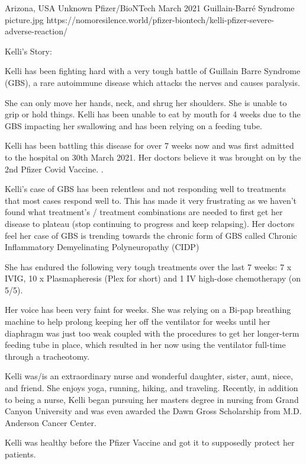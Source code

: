 {Arizona, USA}
{Unknown}
{Pfizer/BioNTech}
{March 2021}
{Guillain-Barré Syndrome}
{picture.jpg}
{https://nomoresilence.world/pfizer-biontech/kelli-pfizer-severe-adverse-reaction/}
{

Kelli’s Story:

Kelli has been fighting hard with a very tough battle of Guillain Barre Syndrome
(GBS), a rare autoimmune disease which attacks the nerves and causes paralysis.

She can only move her hands, neck, and shrug her shoulders. She is unable to
grip or hold things. Kelli has been unable to eat by mouth for 4 weeks due to
the GBS impacting her swallowing and has been relying on a feeding tube.

Kelli has been battling this disease for over 7 weeks now and was first admitted
to the hospital on 30th March 2021. Her doctors believe it was brought on by the
2nd Pfizer Covid Vaccine. .

Kelli’s case of GBS has been relentless and not responding well to treatments
that most cases respond well to. This has made it very frustrating as we haven’t
found what treatment’s / treatment combinations are needed to first get her
disease to plateau (stop continuing to progress and keep relapsing). Her doctors
feel her case of GBS is trending towards the chronic form of GBS called Chronic
Inflammatory Demyelinating Polyneuropathy (CIDP)

She has endured the following very tough treatments over the last 7 weeks: 7 x
IVIG, 10 x Plasmapheresis (Plex for short) and 1 IV high-dose chemotherapy (on
5/5).

Her voice has been very faint for weeks. She was relying on a Bi-pap breathing
machine to help prolong keeping her off the ventilator for weeks until her
diaphragm was just too weak coupled with the procedures to get her longer-term
feeding tube in place, which resulted in her now using the ventilator full-time
through a tracheotomy.

Kelli was/is an extraordinary nurse and wonderful daughter, sister, aunt, niece,
and friend. She enjoys yoga, running, hiking, and traveling. Recently, in
addition to being a nurse, Kelli began pursuing her masters degree in nursing
from Grand Canyon University and was even awarded the Dawn Gross Scholarship
from M.D. Anderson Cancer Center.

Kelli was healthy before the Pfizer Vaccine and got it to supposedly protect her
patients.

}
